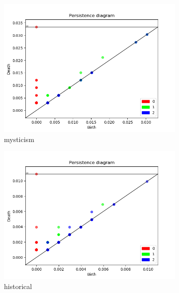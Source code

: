 \documentclass[fleqn]{article}
\begin{document}
\begin{figure}
	\begin{subfigure}[t]{0.425\textwidth}
    	\includegraphics[width=\textwidth]{figures/all_words/mysticism.png}
    	\caption{mysticism}
        \label{fig:all:mysticism}
    \end{subfigure}\hfill
	\begin{subfigure}[t]{0.425\textwidth}
    	\includegraphics[width=\textwidth]{figures/all_words/hystorical.png}
    	\caption{historical}
        \label{fig:all:historical}
    \end{subfigure}\hfill
    \\
	\begin{subfigure}[t]{0.425\textwidth}

\end{subfigure}
\end{figure}
\end{document}
